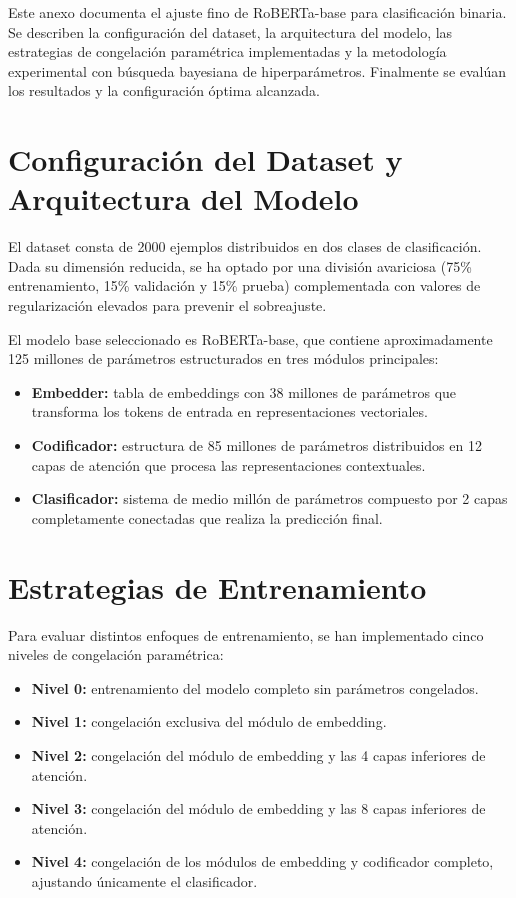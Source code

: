 \label{anexo:entrenamiento}
Este anexo documenta el ajuste fino de RoBERTa-base para clasificación binaria. Se describen la configuración del dataset, la arquitectura del modelo, las estrategias de congelación paramétrica implementadas y la metodología experimental con búsqueda bayesiana de hiperparámetros. Finalmente se evalúan los resultados y la configuración óptima alcanzada.

\section{Configuración del Dataset y Arquitectura del Modelo}

El dataset consta de 2000 ejemplos distribuidos en dos clases de clasificación. Dada su dimensión reducida, se ha optado por una división avariciosa (75\% entrenamiento, 15\% validación y 15\% prueba) complementada con valores de regularización elevados para prevenir el sobreajuste.

El modelo base seleccionado es RoBERTa-base, que contiene aproximadamente 125 millones de parámetros estructurados en tres módulos principales:

\begin{itemize}
  \item \textbf{Embedder:} tabla de embeddings con 38 millones de parámetros que transforma los tokens de entrada en representaciones vectoriales.
  \item \textbf{Codificador:} estructura de 85 millones de parámetros distribuidos en 12 capas de atención que procesa las representaciones contextuales.
  \item \textbf{Clasificador:} sistema de medio millón de parámetros compuesto por 2 capas completamente conectadas que realiza la predicción final. 
\end{itemize}

\section{Estrategias de Entrenamiento}

Para evaluar distintos enfoques de entrenamiento, se han implementado cinco niveles de congelación paramétrica:

\begin{itemize}
  \item \textbf{Nivel 0:} entrenamiento del modelo completo sin parámetros congelados.
  \item \textbf{Nivel 1:} congelación exclusiva del módulo de embedding.
  \item \textbf{Nivel 2:} congelación del módulo de embedding y las 4 capas inferiores de atención.
  \item \textbf{Nivel 3:} congelación del módulo de embedding y las 8 capas inferiores de atención.
  \item \textbf{Nivel 4:} congelación de los módulos de embedding y codificador completo, ajustando únicamente el clasificador. 
\end{itemize}

